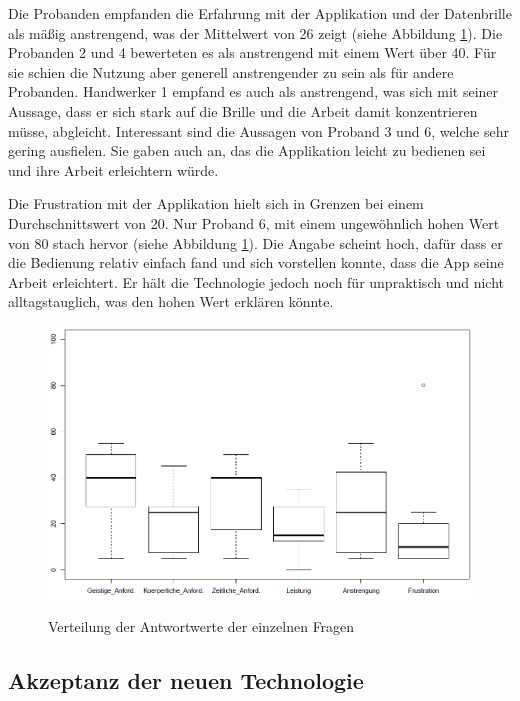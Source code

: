 Die Probanden empfanden die Erfahrung mit der Applikation und der Datenbrille als mäßig anstrengend, was der Mittelwert von 26 zeigt (siehe Abbildung \ref{nasa_questions}). Die Probanden 2 und 4 bewerteten es als anstrengend mit einem Wert über 40. Für sie schien die Nutzung aber generell anstrengender zu sein als für andere Probanden. Handwerker 1 empfand es auch als anstrengend, was sich mit seiner Aussage, dass er sich stark auf die Brille und die Arbeit damit konzentrieren müsse, abgleicht. Interessant sind die Aussagen von Proband 3 und 6, welche sehr gering ausfielen. Sie gaben auch an, das die Applikation leicht zu bedienen sei und ihre Arbeit erleichtern würde.

Die Frustration mit der Applikation hielt sich in Grenzen bei einem Durchschnittswert von 20. Nur Proband 6, mit einem ungewöhnlich hohen Wert von 80 stach hervor (siehe Abbildung \ref{nasa_questions}). Die Angabe scheint hoch, dafür dass er die Bedienung relativ einfach fand und sich vorstellen konnte, dass die App seine Arbeit erleichtert. Er hält die Technologie jedoch noch für unpraktisch und nicht alltagstauglich, was den hohen Wert erklären könnte. 

\begin{figure}[h]
	\begin{center}
		\includegraphics[scale=0.5]{Resources/Evaluation/nasa_questions.png}
		\label{nasa_questions}
		\caption{Verteilung der Antwortwerte der einzelnen Fragen}	
	\end{center}
\end{figure}

\subsection{Akzeptanz der neuen Technologie}


